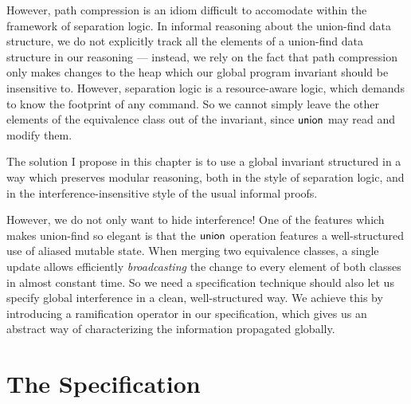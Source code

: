 However, path compression is an idiom difficult to accomodate within
the framework of separation logic. In informal reasoning about the
union-find data structure, we do not explicitly track all the elements
of a union-find data structure in our reasoning --- instead, we rely
on the fact that path compression only makes changes to the heap which
our global program invariant should be insensitive to. However,
separation logic is a resource-aware logic, which demands to know the
footprint of any command. So we cannot simply leave the other elements
of the equivalence class out of the invariant, since $\mathsf{union}$ may read
and modify them.

The solution I propose in this chapter is to use a global invariant
structured in a way which preserves modular reasoning, both in the
style of separation logic, and in the interference-insensitive style
of the usual informal proofs. 

However, we do not only want to hide interference! One of the features
which makes union-find so elegant is that the $\mathsf{union}$ operation
features a well-structured use of aliased mutable state.  When merging
two equivalence classes, a single update allows efficiently
\emph{broadcasting} the change to every element of both classes in
almost constant time.  So we need a specification technique should also
let us specify global interference in a clean, well-structured way. We
achieve this by introducing a ramification operator in our
specification, which gives us an abstract way of characterizing the
information propagated globally.

\section{The Specification}

